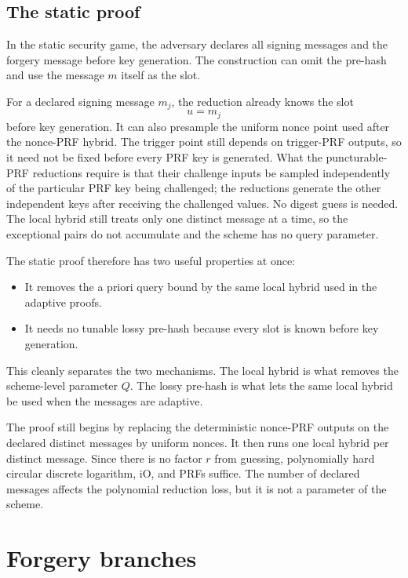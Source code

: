 \documentclass[11pt]{article}
\begin{document}
\subsection{The static proof}

In the static security game, the adversary declares all signing messages and
the forgery message before key generation.  The construction can omit the
pre-hash and use the message \(m\) itself as the slot.

For a declared signing message \(m_j\), the reduction already knows the slot
\[
  u=m_j
\]
before key generation.  It can also presample the uniform nonce point used
after the nonce-PRF hybrid.  The trigger point still depends on trigger-PRF
outputs, so it need not be fixed before every PRF key is generated.  What the
puncturable-PRF reductions require is that their challenge inputs be sampled
independently of the particular PRF key being challenged; the reductions
generate the other independent keys after receiving the challenged values.
No digest guess is needed.  The local hybrid still treats only one distinct
message at a time, so the exceptional pairs do not accumulate and the scheme
has no query parameter.

The static proof therefore has two useful properties at once:

\begin{itemize}[leftmargin=2em]
\item It removes the a priori query bound by the same local hybrid used in the
      adaptive proofs.
\item It needs no tunable lossy pre-hash because every slot is known before
      key generation.
\end{itemize}

This cleanly separates the two mechanisms.  The local hybrid is what removes
the scheme-level parameter \(Q\).  The lossy pre-hash is what lets the same
local hybrid be used when the messages are adaptive.

The proof still begins by replacing the deterministic nonce-PRF outputs on
the declared distinct messages by uniform nonces.  It then runs one local
hybrid per distinct message.  Since there is no factor \(r\) from guessing,
polynomially hard circular discrete logarithm, iO, and PRFs suffice.  The
number of declared messages affects the polynomial reduction loss, but it is
not a parameter of the scheme.

\section{Forgery branches}
\end{document}
